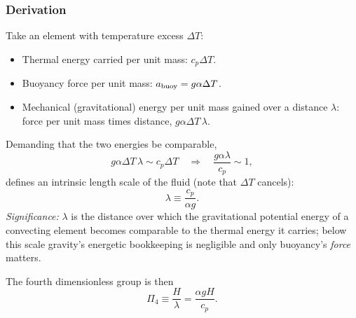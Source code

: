 \subsubsection*{Derivation}
Take an element with temperature excess $\Delta T$:
\begin{itemize}
    \item Thermal energy carried per unit mass: $c_p\Delta T$.
    \item Buoyancy force per unit mass: $a_{\rm buoy}=g\alpha\Delta T$.
    \item Mechanical (gravitational) energy per unit mass gained over a
    distance $\lambda$: force per unit mass times distance,
    $g\alpha\Delta T\,\lambda$.
\end{itemize}
Demanding that the two energies be comparable,
\begin{equation}
    g\alpha\Delta T\,\lambda\sim c_p\Delta T
    \quad\Longrightarrow\quad
    \frac{g\alpha\lambda}{c_p}\sim 1,
    \label{eq:lec09:lambda-balance}
\end{equation}
defines an intrinsic length scale of the fluid (note that $\Delta T$ cancels):
\begin{equation}
    \boxed{
    \lambda\equiv\frac{c_p}{\alpha g}.
    }
    \label{eq:lec09:lambda-definition}
\end{equation}
\textit{Significance:} $\lambda$ is the distance over which the gravitational
potential energy of a convecting element becomes comparable to the thermal
energy it carries; below this scale gravity's energetic bookkeeping is
negligible and only buoyancy's \emph{force} matters.

The fourth dimensionless group is then
\begin{equation}
    \boxed{
    \Pi_4\equiv\frac{H}{\lambda}=\frac{\alpha gH}{c_p}.
    }
    \label{eq:lec09:pi4-definition}
\end{equation}



